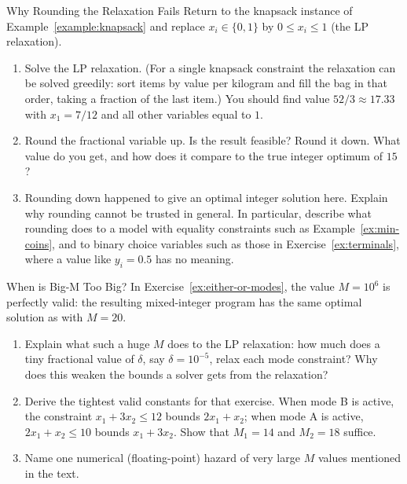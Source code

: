 \begin{ex}{Why Rounding the Relaxation Fails}{}
\label{ex:lp-rounding}
 Return to the knapsack instance of Example~\ref{example:knapsack} and replace $x_i \in \{0,1\}$ by $0 \leq x_i \leq 1$ (the LP relaxation).
\begin{enumerate}
\item Solve the LP relaxation.  (For a single knapsack constraint the relaxation can be solved greedily: sort items by value per kilogram and fill the bag in that order, taking a fraction of the last item.)  You should find value $52/3 \approx 17.33$ with $x_1 = 7/12$ and all other variables equal to $1$.
\item Round the fractional variable up.  Is the result feasible?  Round it down.  What value do you get, and how does it compare to the true integer optimum of $15$?
\item Rounding down happened to give an optimal integer solution here.  Explain why rounding cannot be trusted in general.  In particular, describe what rounding does to a model with equality constraints such as Example~\ref{ex:min-coins}, and to binary choice variables such as those in Exercise~\ref{ex:terminals}, where a value like $y_i = 0.5$ has no meaning.
\end{enumerate}
\end{ex}

\begin{ex}{When is Big-M Too Big?}{}
\label{ex:bigM-size}
 In Exercise~\ref{ex:either-or-modes}, the value $M = 10^6$ is perfectly valid: the resulting mixed-integer program has the same optimal solution as with $M = 20$.
\begin{enumerate}
\item Explain what such a huge $M$ does to the LP relaxation: how much does a tiny fractional value of $\delta$, say $\delta = 10^{-5}$, relax each mode constraint?  Why does this weaken the bounds a solver gets from the relaxation?
\item Derive the tightest valid constants for that exercise.  When mode B is active, the constraint $x_1 + 3x_2 \leq 12$ bounds $2x_1 + x_2$; when mode A is active, $2x_1 + x_2 \leq 10$ bounds $x_1 + 3x_2$.  Show that $M_1 = 14$ and $M_2 = 18$ suffice.
\item Name one numerical (floating-point) hazard of very large $M$ values mentioned in the text.
\end{enumerate}
\end{ex}

